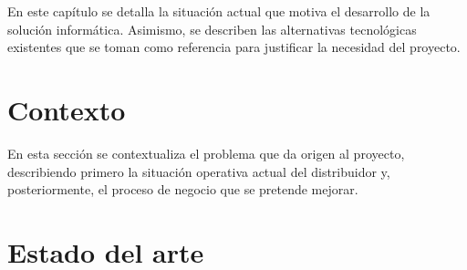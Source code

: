 En este capítulo se detalla la situación actual que motiva el desarrollo de la solución informática. Asimismo, se describen las alternativas tecnológicas existentes que se toman como referencia para justificar la necesidad del proyecto.

\section{Contexto} 
\label{sec:context}

En esta sección se contextualiza el problema que da origen al proyecto, describiendo primero la situación operativa actual del distribuidor y, posteriormente, el proceso de negocio que se pretende mejorar.



\section{Estado del arte}
\label{sec:stateoftheart}

